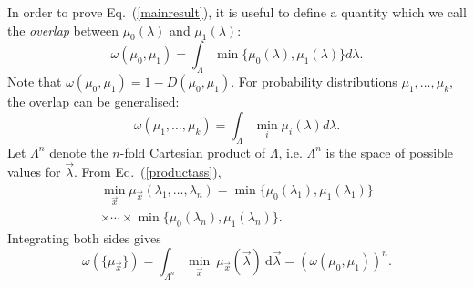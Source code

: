 \documentclass[amsmath,amssymb,superscriptaddress,twocolumn,pra]{revtex4-1}
\begin{document}
In order to prove Eq.~(\ref{mainresult}), it is useful to define a quantity which we call the \emph{overlap} between $\mu_0(\lambda)$ and $\mu_1(\lambda)$:
\begin{equation}
\omega(\mu_0,\mu_1) = \int_\Lambda \min\{\mu_0(\lambda), \mu_1(\lambda)\}  d\lambda.\label{overlapdef}
\end{equation}
Note that $\omega(\mu_0,\mu_1) = 1 - D(\mu_0,\mu_1)$. 
For probability distributions $\mu_1, \dotsc, \mu_k$, the overlap can be generalised:
\begin{equation}
\omega(\mu_1,\ldots,\mu_k) = \int_\Lambda \min_i \mu_i(\lambda) d\lambda.
\end{equation}
Let $\Lambda^n$ denote the $n$-fold Cartesian product of $\Lambda$, i.e. $\Lambda^n$ is the space of possible values for $\vec{\lambda}$. From Eq.~(\ref{productass}), 
\begin{multline}
\min_{\vec{x}} \mu_{\vec{x}}(\lambda_1, \dotsc, \lambda_n) = \min\{\mu_0(\lambda_1),\mu_1(\lambda_1)\}\\\times \dotsm \times \min\{\mu_0(\lambda_n),\mu_1(\lambda_n)\}.
\end{multline}
Integrating both sides gives
\begin{equation}\label{multilem}
\omega\left( \{ \mu_{\vec{x}} \} \right) = \int_{\Lambda^n} \min_{\vec{x}} \ \mu_{\vec{x}}(\vec{\lambda}) \ \mathrm{d}\vec{\lambda} = \left(\omega(\mu_0,\mu_1)\right)^n.
\end{equation}

\end{document}
